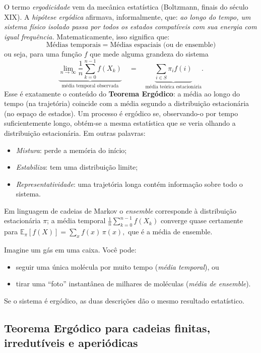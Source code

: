 \documentclass[12pt,letterpaper]{article}
\begin{document}
O termo \emph{ergodicidade} vem da mecânica estatística (Boltzmann,
finais do século XIX). A \emph{hipótese ergódica} afirmava,
informalmente, que: \emph{ao longo do tempo, um sistema físico isolado
  passa por todos os estados compatíveis com sua energia com igual
  frequência.}  Matematicamente, isso significa que:
\[
\text{Médias temporais} \;=\; \text{Médias espaciais (ou de ensemble)}
\]
ou seja, para uma função \( f \) que mede alguma grandeza do sistema
\[
  \underbrace{\lim_{n \to \infty} \frac{1}{n} \sum_{k=0}^{n-1} f(X_k)}_{\text{média temporal observada}}
\quad  = \quad
\underbrace{\sum_{i \in S} \pi_i f(i)}_{\text{média teórica estacionária}}.
\]
Esse é exatamente o conteúdo do \textbf{Teorema Ergódico}: a média ao
longo do tempo (na trajetória) coincide com a média segundo a
distribuição estacionária (no espaço de estados).  Um processo é
{ergódico} se, observando-o por tempo suficientemente longo, obtém-se a
mesma estatística que se veria olhando a distribuição estacionária.  Em
outras palavras:
\begin{itemize}[noitemsep]
  \item \emph{Mistura}: perde a memória do início;
  \item \emph{Estabiliza}: tem uma distribuição limite;
  \item \emph{Representatividade}: uma trajetória longa contém
    informação sobre todo o sistema.
\end{itemize}

Em linguagem de cadeias de Markov o \emph{ensemble} corresponde à
distribuição estacionária \(\pi\); a média temporal
\( \frac{1}{n}\sum_{k=0}^{n-1} f(X_k) \) converge quase certamente para
\( \mathbb{E}_\pi[f(X)] = \sum_x f(x)\,\pi(x), \) que é a média de
ensemble.

Imagine um gás em uma caixa.  Você pode:
\begin{itemize}[noitemsep]
\item seguir uma única molécula por muito tempo (\emph{média
    temporal}), ou
\item tirar uma ``foto'' instantânea de milhares de moléculas
  (\emph{média de ensemble}).
\end{itemize}
Se o sistema é ergódico, as duas descrições dão o mesmo resultado
estatístico.




\subsection*{Teorema Ergódico para cadeias finitas, irredutíveis e aperiódicas}
\end{document}
